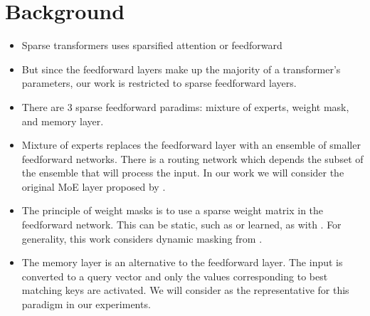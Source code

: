 \section{Background}
\label{sec:background}
\begin{itemize}
    \item Sparse transformers uses sparsified attention or feedforward
    \item But since the feedforward layers make up the majority of a transformer's parameters, our work is restricted to sparse feedforward layers.
    \item There are 3 sparse feedforward paradims: mixture of experts, weight mask, and memory layer.
    \item Mixture of experts \cite{lepikhin_gshard_2020,du_glam_2022,fedus_switch_2022} replaces the feedforward layer with an ensemble of smaller feedforward networks. There is a routing network which depends the subset of the ensemble that will process the input. In our work we will consider the original MoE layer proposed by \cite{shazeer_outrageously_2017}.
    \item The principle of weight masks is to use a sparse weight matrix in the feedforward network. This can be static, such as \cite{chandy_dyad_2023} or learned, as with \cite{jaszczur_sparse_2021}. For generality, this work considers dynamic masking from \cite{jaszczur_sparse_2021}.
    \item The memory layer \cite{lample_large_2019,wang_--fly_2020,rae_scaling_2016} is an alternative to the feedforward layer. The input is converted to a query vector and only the values corresponding to best matching keys are activated. We will consider \cite{lample_large_2019} as the representative for this paradigm in our experiments.
\end{itemize}
